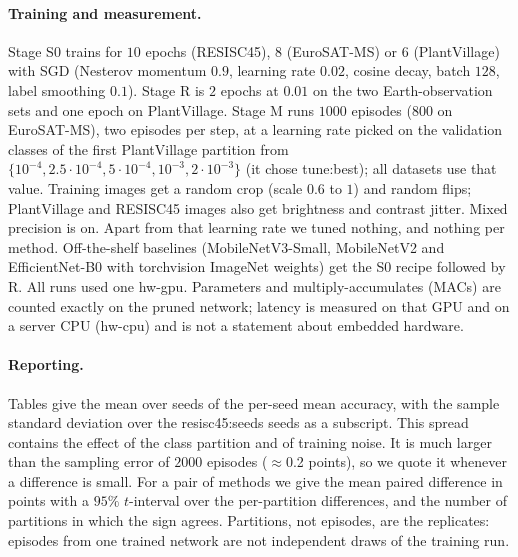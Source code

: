 \paragraph{Training and measurement.}
Stage S0 trains for $10$ epochs (RESISC45), $8$ (EuroSAT-MS) or $6$ (PlantVillage) with SGD (Nesterov momentum $0.9$, learning rate $0.02$, cosine decay, batch $128$, label smoothing $0.1$). Stage R is $2$ epochs at $0.01$ on the two Earth-observation sets and one epoch on PlantVillage. Stage M runs $1000$ episodes ($800$ on EuroSAT-MS), two episodes per step, at a learning rate picked on the validation classes of the first PlantVillage partition from $\{10^{-4},2.5{\cdot}10^{-4},5{\cdot}10^{-4},10^{-3},2{\cdot}10^{-3}\}$ (it chose \num{tune:best}); all datasets use that value. Training images get a random crop (scale $0.6$ to $1$) and random flips; PlantVillage and RESISC45 images also get brightness and contrast jitter. Mixed precision is on. Apart from that learning rate we tuned nothing, and nothing per method. Off-the-shelf baselines (MobileNetV3-Small, MobileNetV2 and EfficientNet-B0 with torchvision ImageNet weights) get the S0 recipe followed by R. All runs used one \num{hw-gpu}. Parameters and multiply-accumulates (MACs) are counted exactly on the pruned network; latency is measured on that GPU and on a server CPU (\num{hw-cpu}) and is not a statement about embedded hardware.

\paragraph{Reporting.}
Tables give the mean over seeds of the per-seed mean accuracy, with the sample standard deviation over the \num{resisc45:seeds} seeds as a subscript. This spread contains the effect of the class partition and of training noise. It is much larger than the sampling error of $2000$ episodes ($\approx$0.2 points), so we quote it whenever a difference is small. For a pair of methods we give the mean paired difference in points with a $95\%$ $t$-interval over the per-partition differences, and the number of partitions in which the sign agrees. Partitions, not episodes, are the replicates: episodes from one trained network are not independent draws of the training run.
